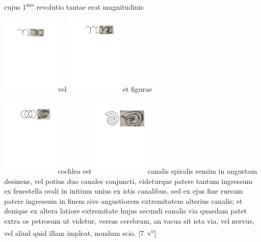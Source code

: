 cujus 1\textsuperscript{ma} revolutio tantae erat magnitudinis \rule[-2.5mm]{0mm}{12.5mm}\includegraphics[width=0.2\textwidth]{images/lh0040104b_007r4.pdf} vel \includegraphics[width=0.2\textwidth]{images/lh0040104b_007r5.pdf} et figurae \rule[-2mm]{0mm}{10mm}\includegraphics[width=0.2\textwidth]{images/lh0040104b_007r6.pdf} cochlea est \includegraphics[width=0.2\textwidth]{images/lh0040104b_007r7.pdf} canalis spiralis sensim in angustam desinens, vel potius duo canales conjuncti, videturque patere tantum ingressum ex fenestella ovali in initium unius ex istis canalibus, sed ex ejus fine rursum patere ingressum in finem sive angustiorem extremitatem alterius canalis;
et denique ex altera latiore extremitate hujus secundi canalis via quaedam patet extra os petrosum ut videtur, versus cerebrum, an vacua sit ista via, vel nervus, vel aliud quid illam impleat, nondum scio.
[7~v\textsuperscript{o}]%
\pend%
